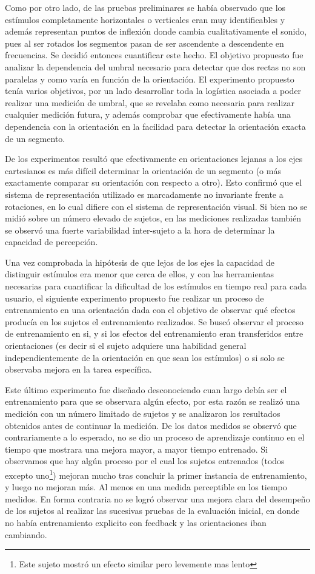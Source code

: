 \documentclass{article}
\numberwithin{figure}{section}
\begin{document}
    Como por otro lado, de las pruebas preliminares se había observado que los estímulos completamente horizontales o verticales eran muy identificables y además representan puntos de inflexión donde cambia cualitativamente el sonido, pues al ser rotados los segmentos pasan de ser ascendente a descendente en frecuencias. Se decidió entonces cuantificar este hecho. El objetivo propuesto fue analizar la dependencia del umbral necesario para detectar que dos rectas no son paralelas y como varía en función de la orientación. El experimento propuesto tenía varios objetivos, por un lado desarrollar toda la logística asociada a poder realizar una medición de umbral, que se revelaba como necesaria para realizar cualquier medición futura, y además comprobar que efectivamente había una dependencia con la orientación en la facilidad para detectar la orientación exacta de un segmento. 
    
    De los experimentos resultó que efectivamente en orientaciones lejanas a los ejes cartesianos es más difícil determinar la orientación de un segmento (o más exactamente comparar su orientación con respecto a otro). Esto confirmó que el sistema de representación utilizado es marcadamente no invariante frente a rotaciones, en lo cual difiere con el sistema de representación visual. Si bien no se midió sobre un número elevado de sujetos, en las mediciones realizadas también se observó una fuerte variabilidad inter-sujeto a la hora de determinar la capacidad de percepción. 
    
    Una vez comprobada la hipótesis de que lejos de los ejes la capacidad de distinguir estímulos era menor que cerca de ellos, y con las herramientas necesarias para cuantificar la dificultad de los estímulos en tiempo real para cada usuario, el siguiente experimento propuesto fue realizar un proceso de entrenamiento en una orientación dada con el objetivo de observar qué efectos producía en los sujetos el entrenamiento realizados. Se buscó observar el proceso de entrenamiento en si, y si los efectos del entrenamiento eran transferidos entre orientaciones (es decir si el sujeto adquiere una habilidad general independientemente de la orientación en que sean los estímulos) o si solo se observaba mejora en la tarea específica.
    
    Este último experimento fue diseñado desconociendo cuan largo debía ser el entrenamiento para que se observara algún efecto, por esta razón se realizó una medición con un número limitado de sujetos y se analizaron los resultados obtenidos antes de continuar la medición. De los datos medidos se observó que contrariamente a lo esperado, no se dio un proceso de aprendizaje continuo en el tiempo que mostrara una mejora mayor, a mayor tiempo entrenado. Si observamos que hay algún proceso por el cual los sujetos entrenados (todos excepto uno\footnote{Este sujeto mostró un efecto similar pero levemente mas lento}) mejoran mucho tras concluir la primer instancia de entrenamiento, y luego no mejoran más. Al menos en una medida perceptible en los tiempo medidos. En forma contraria no se logró observar una mejora clara del desempeño de los sujetos al realizar las sucesivas pruebas de la evaluación inicial, en donde no había entrenamiento explicito con feedback y las orientaciones iban cambiando. 
    
\end{document}
